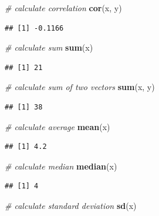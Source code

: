 \documentclass[]{book}
\newenvironment{Shaded}{\begin{snugshade}}{\end{snugshade}}
\newcommand{\KeywordTok}[1]{\textcolor[rgb]{0.13,0.29,0.53}{\textbf{#1}}}
\newcommand{\CommentTok}[1]{\textcolor[rgb]{0.56,0.35,0.01}{\textit{#1}}}
\newcommand{\NormalTok}[1]{#1}
\begin{document}
\begin{Shaded}
\begin{Highlighting}[]
\CommentTok{# calculate correlation}
\KeywordTok{cor}\NormalTok{(x, y)}
\end{Highlighting}
\end{Shaded}

\begin{verbatim}
## [1] -0.1166
\end{verbatim}

\begin{Shaded}
\begin{Highlighting}[]
\CommentTok{# calculate sum}
\KeywordTok{sum}\NormalTok{(x)}
\end{Highlighting}
\end{Shaded}

\begin{verbatim}
## [1] 21
\end{verbatim}

\begin{Shaded}
\begin{Highlighting}[]
\CommentTok{# calculate sum of two vectors}
\KeywordTok{sum}\NormalTok{(x, y)}
\end{Highlighting}
\end{Shaded}

\begin{verbatim}
## [1] 38
\end{verbatim}

\begin{Shaded}
\begin{Highlighting}[]
\CommentTok{# calculate average}
\KeywordTok{mean}\NormalTok{(x)}
\end{Highlighting}
\end{Shaded}

\begin{verbatim}
## [1] 4.2
\end{verbatim}

\begin{Shaded}
\begin{Highlighting}[]
\CommentTok{# calculate median}
\KeywordTok{median}\NormalTok{(x)}
\end{Highlighting}
\end{Shaded}

\begin{verbatim}
## [1] 4
\end{verbatim}

\begin{Shaded}
\begin{Highlighting}[]
\CommentTok{# calculate standard deviation}
\KeywordTok{sd}\NormalTok{(x)}
\end{Highlighting}
\end{Shaded}
\end{document}
